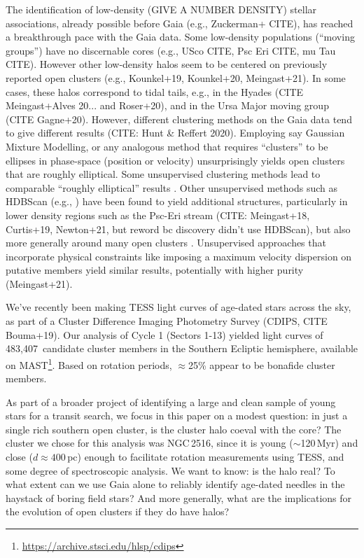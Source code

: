 \documentclass[12pt,twocolumn,tighten]{aastex63}
\newcommand{\numsouthernuniqlcs}{483{,}407\ } %
\begin{document}
The identification of low-density (GIVE A NUMBER DENSITY) stellar
associations, already possible before Gaia (e.g.,
Zuckerman+ CITE), has reached a breakthrough pace with the Gaia data.
Some low-density populations (``moving groups'') have no discernable
cores (e.g., USco CITE, Psc Eri CITE, mu Tau CITE).
However other
low-density
halos seem to be centered on previously reported open clusters (e.g.,
Kounkel+19, Kounkel+20, Meingast+21).  In some
cases, these halos correspond to tidal tails, e.g., in the Hyades
(CITE Meingast+Alves 20... and Roser+20), and in the Ursa Major moving
group (CITE Gagne+20). 
However, different clustering methods on the
Gaia data tend to give different results (CITE: Hunt \& Reffert 2020).
Employing say Gaussian Mixture Modelling, or any analogous method that
requires ``clusters'' to be ellipses in phase-space (position or
velocity) unsurprisingly yields open clusters that are roughly
elliptical.  Some unsupervised clustering methods lead to comparable
``roughly elliptical'' results \citep[][hereafter
]{cantatgaudin_gaia_2018}.  Other
unsupervised methods such as HDBScan (e.g., \citep[][hereafter
]{kounkel_untangling_2019}) have
been found to yield additional structures, particularly in lower
density regions such as the Psc-Eri stream (CITE: Meingast+18,
Curtis+19, Newton+21, but reword bc discovery didn't use HDBScan), but
also more generally around many open clusters
\citep{kounkel_untangling_2019}.  Unsupervised approaches that
incorporate physical constraints like imposing a maximum velocity
dispersion on putative members yield similar results, potentially with
higher purity (Meingast+21).


We've recently been making TESS light curves of age-dated stars across
the sky, as part of a Cluster Difference Imaging Photometry Survey
(CDIPS, CITE Bouma+19).  Our analysis of Cycle 1 (Sectors 1-13) yielded
light curves of \numsouthernuniqlcs candidate cluster members in the
Southern Ecliptic hemisphere, available on
MAST\footnote{\url{https://archive.stsci.edu/hlsp/cdips}}.  Based on
rotation periods, $\approx$25\% appear to be bonafide cluster members. 

As part of a broader project of identifying a large and clean sample of
young stars for a transit search, we focus in this paper on a 
modest question: in just a single rich southern open cluster, is the
cluster halo coeval with the core?  The cluster we chose for this
analysis was NGC\,2516, since it is young ($\sim$120\,Myr) and close
($d\approx400$\,pc) enough to facilitate rotation measurements using
TESS, and some degree of spectroscopic analysis.  We want to know: is
the halo real? To what extent can we use Gaia alone to reliably identify
age-dated needles in the haystack of boring field stars?  And more
generally, what are the implications for the evolution of open clusters
if they do have halos?
\end{document}
